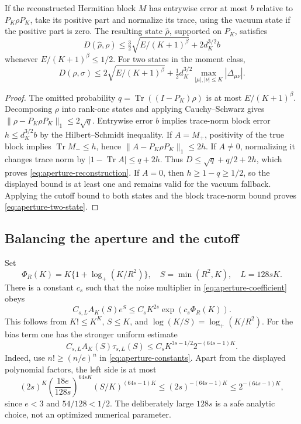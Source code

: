\begin{lemma}
\label{lem:aperture-state}
If the reconstructed Hermitian block $M$ has entrywise error at most $b$
relative to $P_K\rho P_K$, take its positive part and normalize its trace,
using the vacuum state if the positive part is zero. The resulting state
$\widehat\rho$, supported on $P_K$, satisfies
\[
 D(\widehat\rho,\rho)
 \le \tfrac32\sqrt{E/(K+1)^\beta}+2d_K^{3/2}b
 \tag{A.8}\label{eq:aperture-reconstruction}
\]
whenever $E/(K+1)^\beta\le1/2$. For two states in the moment class,
\[
 D(\rho,\sigma)
 \le2\sqrt{E/(K+1)^\beta}
    +\tfrac12d_K^{3/2}\max_{|\mu|,|\nu|\le K}|\Delta_{\mu\nu}|.
 \tag{A.9}\label{eq:aperture-two-state}
\]
\end{lemma}
\begin{proof}
The omitted probability $q=\operatorname{Tr}((I-P_K)\rho)$ is at most
$E/(K+1)^\beta$. Decomposing $\rho$ into rank-one states and applying
Cauchy--Schwarz gives
$\|\rho-P_K\rho P_K\|_1\le2\sqrt q$.
Entrywise error $b$ implies trace-norm block error
$h\le d_K^{3/2}b$ by the Hilbert--Schmidt inequality.
If $A=M_+$, positivity of the true block implies
$\operatorname{Tr}M_-\le h$, hence
$\|A-P_K\rho P_K\|_1\le2h$.
If $A\ne0$, normalizing it changes trace norm by
$|1-\operatorname{Tr}A|\le q+2h$.
Thus $D\le\sqrt q+q/2+2h$, which proves \eqref{eq:aperture-reconstruction}.
If $A=0$, then $h\ge1-q\ge1/2$, so the displayed bound is at least one
and remains valid for the vacuum fallback. Applying the cutoff bound to
both states and the block trace-norm bound proves \eqref{eq:aperture-two-state}.
\end{proof}

\subsection{Balancing the aperture and the cutoff}
Set
\[
 \Phi_R(K)=K\{1+\log_+(K/R^2)\},\quad
 S=\min(R^2,K),\quad L=128sK.
 \tag{A.10}\label{eq:aperture-phi}
\]
There is a constant $c_s$ such that the noise multiplier in
\eqref{eq:aperture-coefficient} obeys
\[
 C_{s,L}A_K(S)e^S\le C_sK^{2s}\exp(c_s\Phi_R(K)).
 \tag{A.11}\label{eq:aperture-noise}
\]
This follows from $K!\le K^K$, $S\le K$, and
$\log(K/S)=\log_+(K/R^2)$.
For the bias term one has the stronger uniform estimate
\[
 C_{s,L}A_K(S)\tau_{s,L}(S)
 \le C_sK^{3s-1/2}2^{-(64s-1)K}.
 \tag{A.12}\label{eq:aperture-bias}
\]
Indeed, use $n!\ge(n/e)^n$ in \eqref{eq:aperture-constants}. Apart from
the displayed polynomial factors, the left side is at most
\[
 (2s)^K\left(\frac{18e}{128s}\right)^{64sK}
        (S/K)^{(64s-1)K}
 \le(2s)^{-(64s-1)K}\le2^{-(64s-1)K},
\]
since $e<3$ and $54/128<1/2$. The deliberately large $128s$ is a safe
analytic choice, not an optimized numerical parameter.

